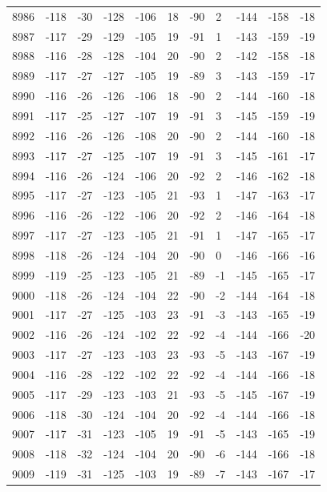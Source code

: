\begin{table}[H]
\begin{tabular}{lllllllllll}
8986 & -118 & -30 & -128 & -106 & 18 & -90 & 2 & -144 & -158 & -18 \\
8987 & -117 & -29 & -129 & -105 & 19 & -91 & 1 & -143 & -159 & -19 \\
8988 & -116 & -28 & -128 & -104 & 20 & -90 & 2 & -142 & -158 & -18 \\
8989 & -117 & -27 & -127 & -105 & 19 & -89 & 3 & -143 & -159 & -17 \\
8990 & -116 & -26 & -126 & -106 & 18 & -90 & 2 & -144 & -160 & -18 \\
8991 & -117 & -25 & -127 & -107 & 19 & -91 & 3 & -145 & -159 & -19 \\
8992 & -116 & -26 & -126 & -108 & 20 & -90 & 2 & -144 & -160 & -18 \\
8993 & -117 & -27 & -125 & -107 & 19 & -91 & 3 & -145 & -161 & -17 \\
8994 & -116 & -26 & -124 & -106 & 20 & -92 & 2 & -146 & -162 & -18 \\
8995 & -117 & -27 & -123 & -105 & 21 & -93 & 1 & -147 & -163 & -17 \\
8996 & -116 & -26 & -122 & -106 & 20 & -92 & 2 & -146 & -164 & -18 \\
8997 & -117 & -27 & -123 & -105 & 21 & -91 & 1 & -147 & -165 & -17 \\
8998 & -118 & -26 & -124 & -104 & 20 & -90 & 0 & -146 & -166 & -16 \\
8999 & -119 & -25 & -123 & -105 & 21 & -89 & -1 & -145 & -165 & -17 \\
9000 & -118 & -26 & -124 & -104 & 22 & -90 & -2 & -144 & -164 & -18 \\
9001 & -117 & -27 & -125 & -103 & 23 & -91 & -3 & -143 & -165 & -19 \\
9002 & -116 & -26 & -124 & -102 & 22 & -92 & -4 & -144 & -166 & -20 \\
9003 & -117 & -27 & -123 & -103 & 23 & -93 & -5 & -143 & -167 & -19 \\
9004 & -116 & -28 & -122 & -102 & 22 & -92 & -4 & -144 & -166 & -18 \\
9005 & -117 & -29 & -123 & -103 & 21 & -93 & -5 & -145 & -167 & -19 \\
9006 & -118 & -30 & -124 & -104 & 20 & -92 & -4 & -144 & -166 & -18 \\
9007 & -117 & -31 & -123 & -105 & 19 & -91 & -5 & -143 & -165 & -19 \\
9008 & -118 & -32 & -124 & -104 & 20 & -90 & -6 & -144 & -166 & -18 \\
9009 & -119 & -31 & -125 & -103 & 19 & -89 & -7 & -143 & -167 & -17 \\

\end{tabular}
\end{table}

